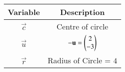 \begin{tabular}[12pt]{ |c| c|}
    \hline
    \textbf{Variable} & \textbf{Description}\\ 
    \hline
	$\vec{c}$ & Centre of circle \\
    \hline
	$\vec{u}$ & $\mathbf{-u}=\begin{pmatrix}2\\-3\end{pmatrix}$\\
	\hline
	$\vec{r}$ & Radius of Circle = $4$\\
	\hline
    \end{tabular}
